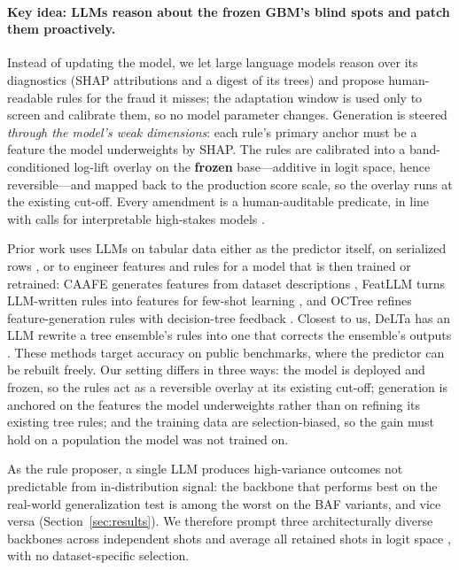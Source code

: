 \documentclass[11pt]{article}
\begin{document}
\paragraph{Key idea: LLMs reason about the frozen GBM's blind spots and patch them proactively.}
Instead of updating the model, we let large language models reason over its diagnostics (SHAP
attributions and a digest of its trees) and propose human-readable rules for the fraud it misses; the
adaptation window is used only to screen and calibrate them, so no model parameter changes.
Generation is steered \emph{through the model's weak dimensions}: each rule's primary anchor must be a
feature the model underweights by SHAP. The rules are calibrated into a band-conditioned log-lift
overlay on the \textbf{frozen} base---additive in logit space, hence reversible---and mapped back to
the production score scale, so the overlay runs at the existing cut-off. Every amendment is a
human-auditable predicate, in line with calls for interpretable high-stakes models
\citep{rudin2019interpretable}.

Prior work uses LLMs on tabular data either as the predictor itself, on serialized rows
\citep{hegselmann2023tabllm,dinh2022lift}, or to engineer features and rules for a model that is
then trained or retrained: CAAFE generates features from dataset descriptions
\citep{hollmann2023caafe}, FeatLLM turns LLM-written rules into features for few-shot learning
\citep{han2024featllm}, and OCTree refines feature-generation rules with decision-tree feedback
\citep{nam2024octree}. Closest to us, DeLTa has an LLM rewrite a tree ensemble's rules into one that
corrects the ensemble's outputs \citep{ye2025delta}. These methods target accuracy on public
benchmarks, where the predictor can be rebuilt freely. Our setting differs in three ways: the model is
deployed and frozen, so the rules act as a reversible overlay at its existing cut-off; generation is
anchored on the features the model underweights rather than on refining its existing tree rules; and the
training data are selection-biased, so the gain must hold on a population the model was not trained
on.

As the rule proposer, a single LLM produces high-variance outcomes not predictable from in-distribution
signal: the backbone that performs best on the real-world generalization test is among the worst on
the BAF variants, and vice versa (Section~\ref{sec:results}). We therefore prompt three
architecturally diverse backbones \citep{wei2022cot,deepseek2025r1,qwen2026qwen35,gemma2026gemma4} across
independent shots and average all retained shots in logit space \citep{dietterich2000ensemble}, with
no dataset-specific selection.
\end{document}
